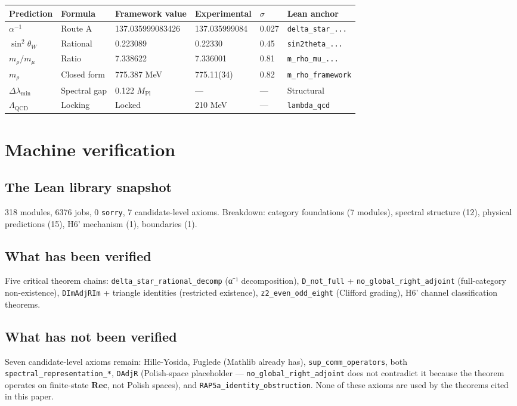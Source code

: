\documentclass[11pt,twoside]{article}
\newcommand{\rec}{\mathbf{Rec}}
\begin{document}
\begin{center}
\begin{tabular}{l l l l l l}
Prediction & Formula & Framework value & Experimental & $\sigma$ & Lean anchor \\
\hline
$\alpha^{-1}$ & Route A & 137.035999083426 & 137.035999084 & 0.027 & \texttt{delta\_star\_...} \\
$\sin^2\theta_W$ & Rational & 0.223089 & 0.22330 & 0.45 & \texttt{sin2theta\_...} \\
$m_\rho/m_\mu$ & Ratio & 7.338622 & 7.336001 & 0.81 & \texttt{m\_rho\_mu\_...} \\
$m_\rho$ & Closed form & 775.387 MeV & 775.11(34) & 0.82 & \texttt{m\_rho\_framework} \\
$\Delta\lambda_{\min}$ & Spectral gap & 0.122 $M_{\mathrm{Pl}}$ & — & — & Structural \\
$\Lambda_{\mathrm{QCD}}$ & Locking & Locked & 210 MeV & — & \texttt{lambda\_qcd} \\
\end{tabular}
\end{center}

\section{Machine verification}
\label{sec:machine}

\subsection{The Lean library snapshot}
318 modules, 6376 jobs, 0 \texttt{sorry}, 7 candidate-level axioms. Breakdown: category foundations (7 modules), spectral structure (12), physical predictions (15), H6' mechanism (1), boundaries (1).

\subsection{What has been verified}
Five critical theorem chains: \texttt{delta\_star\_rational\_decomp} (α⁻¹ decomposition), \texttt{D\_not\_full} + \texttt{no\_global\_right\_adjoint} (full-category non-existence), \texttt{DImAdjRIm} + triangle identities (restricted existence), \texttt{z2\_even\_odd\_eight} (Clifford grading), H6' channel classification theorems.

\subsection{What has not been verified}
Seven candidate-level axioms remain: Hille-Yosida, Fuglede (Mathlib already has), \texttt{sup\_comm\_operators}, both \texttt{spectral\_representation\_*}, \texttt{DAdjR} (Polish-space placeholder — \texttt{no\_global\_right\_adjoint} does not contradict it because the theorem operates on finite-state $\rec$, not Polish spaces), and \texttt{RAP5a\_identity\_obstruction}. None of these axioms are used by the theorems cited in this paper.
\end{document}
